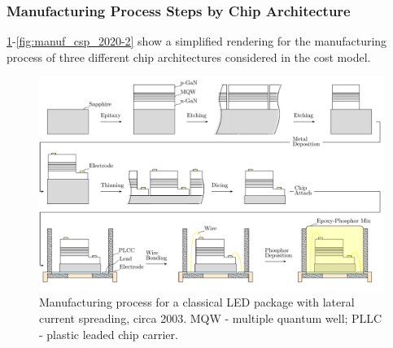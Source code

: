 \documentclass[parskip=full]{article}
\begin{document}
\subsubsection{Manufacturing Process Steps by Chip Architecture}
\label{subsec:manufacturing_steps}

\cref{fig:manuf_classical_2003}-\cref{fig:manuf_csp_2020-2} show a simplified rendering for the manufacturing process of three different chip architectures considered in the cost model.


    \begin{landscape}
        \begin{figure}
            \includegraphics[width=555pt]{./figures/classical_overview_2003.pdf}
            \caption{Manufacturing process for a classical LED package with lateral current spreading, circa 2003. MQW - multiple quantum well; PLLC - plastic leaded chip carrier.}
            \label{fig:manuf_classical_2003}
        \end{figure}
    \end{landscape}
    
\end{document}

